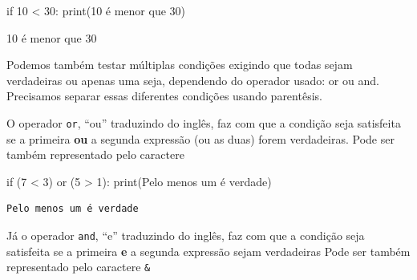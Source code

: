 \documentclass[
  letterpaper,
  DIV=11,
  numbers=noendperiod]{scrreprt}
\newenvironment{Shaded}{\begin{snugshade}}{\end{snugshade}}
\newcommand{\BuiltInTok}[1]{\textcolor[rgb]{0.00,0.23,0.31}{#1}}
\newcommand{\ControlFlowTok}[1]{\textcolor[rgb]{0.00,0.23,0.31}{#1}}
\newcommand{\DecValTok}[1]{\textcolor[rgb]{0.68,0.00,0.00}{#1}}
\newcommand{\KeywordTok}[1]{\textcolor[rgb]{0.00,0.23,0.31}{#1}}
\newcommand{\NormalTok}[1]{\textcolor[rgb]{0.00,0.23,0.31}{#1}}
\newcommand{\OperatorTok}[1]{\textcolor[rgb]{0.37,0.37,0.37}{#1}}
\newcommand{\StringTok}[1]{\textcolor[rgb]{0.13,0.47,0.30}{#1}}
\begin{document}
\begin{Shaded}
\begin{Highlighting}[]
\ControlFlowTok{if} \DecValTok{10} \OperatorTok{\textless{}} \DecValTok{30}\NormalTok{:}
    \BuiltInTok{print}\NormalTok{(}\StringTok{\textquotesingle{}10 é menor que 30\textquotesingle{}}\NormalTok{)}
\end{Highlighting}
\end{Shaded}

\begin{tcolorbox}[enhanced jigsaw, breakable, leftrule=.75mm, left=2mm, opacityback=0, bottomrule=.15mm, toprule=.15mm, rightrule=.15mm, arc=.35mm, colback=white]

10 é menor que 30

\end{tcolorbox}

Podemos também testar múltiplas condições exigindo que todas sejam
verdadeiras ou apenas uma seja, dependendo do operador usado: or ou and.
Precisamos separar essas diferentes condições usando parentêsis.

O operador \texttt{or}, ``ou'' traduzindo do inglês, faz com que a
condição seja satisfeita se a primeira \textbf{ou} a segunda expressão
(ou as duas) forem verdadeiras. Pode ser também representado pelo
caractere \texttt{\textbar{}}

\begin{Shaded}
\begin{Highlighting}[]
\ControlFlowTok{if}\NormalTok{ (}\DecValTok{7} \OperatorTok{\textless{}} \DecValTok{3}\NormalTok{) }\KeywordTok{or}\NormalTok{ (}\DecValTok{5} \OperatorTok{\textgreater{}} \DecValTok{1}\NormalTok{):}
    \BuiltInTok{print}\NormalTok{(}\StringTok{\textquotesingle{}Pelo menos um é verdade\textquotesingle{}}\NormalTok{)}
\end{Highlighting}
\end{Shaded}

\begin{tcolorbox}[enhanced jigsaw, breakable, leftrule=.75mm, left=2mm, opacityback=0, bottomrule=.15mm, toprule=.15mm, rightrule=.15mm, arc=.35mm, colback=white]

\begin{verbatim}
Pelo menos um é verdade
\end{verbatim}

\end{tcolorbox}

Já o operador \texttt{and}, ``e'' traduzindo do inglês, faz com que a
condição seja satisfeita se a primeira \textbf{e} a segunda expressão
sejam verdadeiras Pode ser também representado pelo caractere
\texttt{\&}
\end{document}
